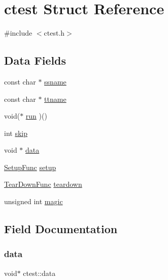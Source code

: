 \hypertarget{structctest}{}\section{ctest Struct Reference}
\label{structctest}


{\ttfamily \#include $<$ctest.\+h$>$}

\subsection*{Data Fields}
\begin{DoxyCompactItemize}
\item 
const char $\ast$ \mbox{\hyperlink{structctest_a22c00ac32556a836ad36a1c6e884031d}{ssname}}
\item 
const char $\ast$ \mbox{\hyperlink{structctest_a18c814d874c53cd386192525a2045954}{ttname}}
\item 
void($\ast$ \mbox{\hyperlink{structctest_ae17aeaf044809dbcf6258c38cf6c8cab}{run}} )()
\item 
int \mbox{\hyperlink{structctest_aa370fc3a1ca838de6bf4e3fa3a12d605}{skip}}
\item 
void $\ast$ \mbox{\hyperlink{structctest_a6a274c4182b5ed85ce47d6922e50ccdf}{data}}
\item 
\mbox{\hyperlink{ctest_8h_ac6f37ec4be866db5ef2d42c4b38b7b4d}{Setup\+Func}} \mbox{\hyperlink{structctest_a5d7683856aab7a122f28bf4c56244bc1}{setup}}
\item 
\mbox{\hyperlink{ctest_8h_a4ec8c3cb86c5d196d45fb020b1b8cabc}{Tear\+Down\+Func}} \mbox{\hyperlink{structctest_ab9e135ee92db9511b1cf3592dffec011}{teardown}}
\item 
unsigned int \mbox{\hyperlink{structctest_a5bcb93cfa1678372aeace0aba6e12dda}{magic}}
\end{DoxyCompactItemize}


\subsection{Field Documentation}
\mbox{\label{structctest_a6a274c4182b5ed85ce47d6922e50ccdf}} 
\subsubsection{\texorpdfstring{data}{data}}
{\footnotesize\ttfamily void$\ast$ ctest\+::data}

